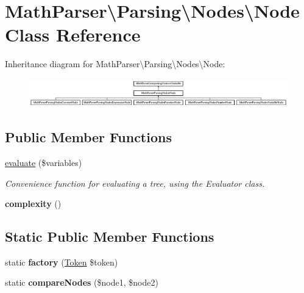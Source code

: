 \hypertarget{classMathParser_1_1Parsing_1_1Nodes_1_1Node}{\section{Math\-Parser\textbackslash{}Parsing\textbackslash{}Nodes\textbackslash{}Node Class Reference}
\label{classMathParser_1_1Parsing_1_1Nodes_1_1Node}
}
Inheritance diagram for Math\-Parser\textbackslash{}Parsing\textbackslash{}Nodes\textbackslash{}Node\-:\begin{figure}[H]
\begin{center}
\leavevmode
\includegraphics[height=1.249071cm]{classMathParser_1_1Parsing_1_1Nodes_1_1Node}
\end{center}
\end{figure}
\subsection*{Public Member Functions}
\begin{DoxyCompactItemize}
\item 
\hyperlink{classMathParser_1_1Parsing_1_1Nodes_1_1Node_aa365c3dd42885fc67f00f88578994788}{evaluate} (\$variables)
\begin{DoxyCompactList}\small\item\em Convenience function for evaluating a tree, using the Evaluator class. \end{DoxyCompactList}\item 
\hypertarget{classMathParser_1_1Parsing_1_1Nodes_1_1Node_a607d20250ecf48ac6842531cde46daff}{{\bfseries complexity} ()}\label{classMathParser_1_1Parsing_1_1Nodes_1_1Node_a607d20250ecf48ac6842531cde46daff}

\end{DoxyCompactItemize}
\subsection*{Static Public Member Functions}
\begin{DoxyCompactItemize}
\item 
\hypertarget{classMathParser_1_1Parsing_1_1Nodes_1_1Node_ad6545a234a585ce6dad63c6337483cb7}{static {\bfseries factory} (\hyperlink{classMathParser_1_1Lexing_1_1Token}{Token} \$token)}\label{classMathParser_1_1Parsing_1_1Nodes_1_1Node_ad6545a234a585ce6dad63c6337483cb7}

\item 
\hypertarget{classMathParser_1_1Parsing_1_1Nodes_1_1Node_a9d672f21f7fa25a3cfe0a940d3643b97}{static {\bfseries compare\-Nodes} (\$node1, \$node2)}\label{classMathParser_1_1Parsing_1_1Nodes_1_1Node_a9d672f21f7fa25a3cfe0a940d3643b97}

\end{DoxyCompactItemize}



